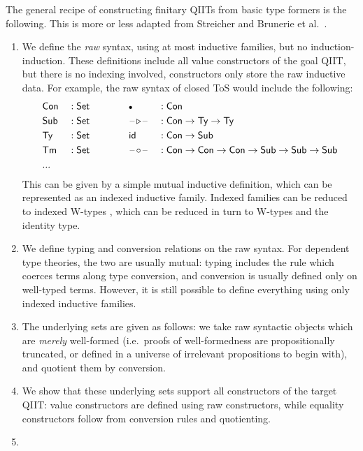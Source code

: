 \documentclass[12pt,a4paper,twoside,openany]{book}
\theoremstyle{remark}
\theoremstyle{definition}
\theoremstyle{theorem}
\newcommand{\id}{\mathsf{id}}
\newcommand{\Con}{\mathsf{Con}}
\newcommand{\Sub}{\mathsf{Sub}}
\newcommand{\Tm}{\mathsf{Tm}}
\newcommand{\Ty}{\mathsf{Ty}}
\newcommand{\blank}{\mathord{\hspace{1pt}\text{--}\hspace{1pt}}}
\newcommand{\Set}{\mathsf{Set}}
\newcommand{\ext}{\triangleright}
\newcommand{\emptycon}{\scaleobj{.75}\bullet}
\begin{document}
The general recipe of constructing finitary QIITs from basic type formers is the
following. This is more or less adapted from Streicher \cite{streicher93habil}
and Brunerie et al.\ \cite{brunerie}.
\begin{enumerate}
  \item
    We define the \emph{raw} syntax, using at most inductive families, but
    no induction-induction. These definitions include all value constructors of
    the goal QIIT, but there is no indexing involved, constructors only store
    the raw inductive data. For example, the raw syntax of closed ToS would
    include the following:
    \begin{alignat*}{5}
      & \Con &&: \Set \hspace{3em}&& \emptycon             &&: \Con\\
      & \Sub &&: \Set && \blank\!\ext\!\blank  &&: \Con \to \Ty \to \Ty \\
      & \Ty  &&: \Set && \id                   &&: \Con \to \Sub \\
      & \Tm  &&: \Set && \blank\!\circ\!\blank &&: \Con \to \Con \to \Con \to \Sub \to \Sub \to \Sub\\
      & ... && &&
    \end{alignat*}
    This can be given by a simple mutual inductive definition, which can be
    represented as an indexed inductive family. Indexed families can be
    reduced to indexed W-types \cite{mutualinductive}, which can be
    reduced in turn to W-types and the identity type.
  \item
    We define typing and conversion relations on the raw syntax. For dependent
    type theories, the two are usually mutual: typing includes the rule which
    coerces terms along type conversion, and conversion is usually defined only
    on well-typed terms.  However, it is still possible to define everything
    using only indexed inductive families.
  \item
    The underlying sets are given as follows: we take raw syntactic objects
    which are \emph{merely} well-formed (i.e.\ proofs of well-formedness are
    propositionally truncated, or defined in a universe of irrelevant
    propositions to begin with), and quotient them by conversion.
  \item
    We show that these underlying sets support all constructors of the target
    QIIT: value constructors are defined using raw constructors, while
    equality constructors follow from conversion rules and quotienting.
  \item

\end{enumerate}
\end{document}
